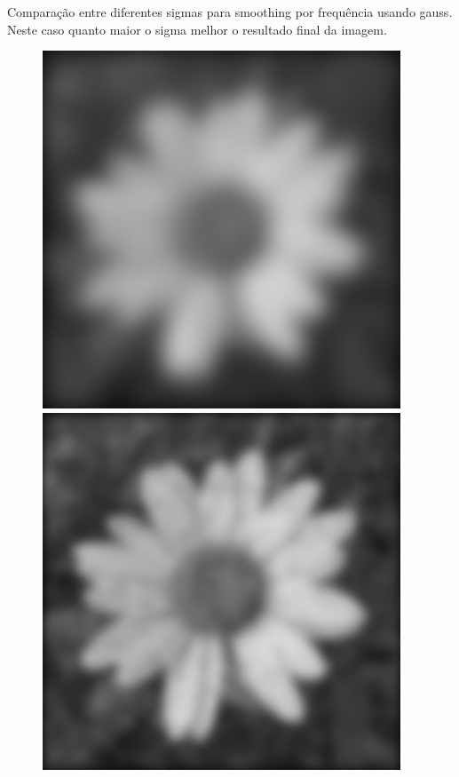\documentclass[a4paper]{report}
\begin{document}
Comparação entre diferentes sigmas para smoothing por frequência usando gauss. Neste caso quanto maior o sigma melhor o resultado final da imagem.
\begin{figure}[H]
\centering
\begin{minipage}{.3\textwidth}
  \centering
    \includegraphics[width=0.95\textwidth]{images/Smooth/frequency-salt-n-pepper/flower_smooth_frequency_gaussian_10_1.png}
\end{minipage}%
\begin{minipage}{.3\textwidth}
  \centering
    \includegraphics[width=0.95\textwidth]{images/Smooth/frequency-salt-n-pepper/flower_smooth_frequency_gaussian_20_1.png}

\end{minipage}
\end{figure}
\end{document}
